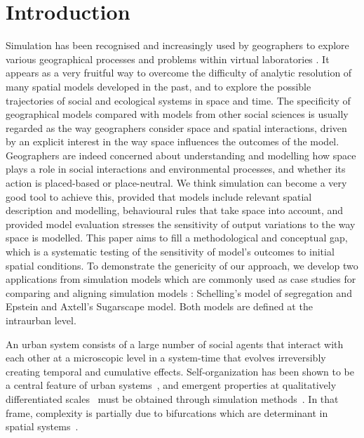 \documentclass[Afour,sageh,times]{sagej}
\begin{document}

\maketitle




\section{Introduction}

Simulation has been recognised and increasingly used by geographers to explore various geographical processes and problems within virtual laboratories \citep{Quesneletal2009} . It appears as a very fruitful way to overcome the difficulty of analytic resolution of many spatial models developed in the past, and to explore the possible trajectories of social and ecological systems in space and time. The specificity of geographical models compared with models from other social sciences is usually regarded as the way geographers consider space and spatial interactions, driven by an explicit interest in the way space influences the outcomes of the model. Geographers are indeed concerned about understanding and modelling how space plays a role in social interactions and environmental processes, and whether its action is placed-based or place-neutral. We think simulation can become a very good tool to achieve this, provided that models include relevant spatial description and modelling, behavioural rules that take space into account, and provided model evaluation stresses the sensitivity of output variations to the way space is modelled. This paper aims to fill a methodological and conceptual gap, which is a systematic testing of the sensitivity of model's outcomes to initial spatial conditions. To demonstrate the genericity of our approach, we develop two applications from simulation models which are commonly used as case studies for comparing and aligning simulation models \citep{Axtelletal1996}: Schelling's model of segregation and Epstein and Axtell's Sugarscape model. Both models are defined at the intraurban level.

An urban system consists of a large number of social agents that interact with each other at a microscopic level in a system-time that evolves irreversibly creating temporal and cumulative effects. Self-organization has been shown to be a central feature of urban systems~\citep{AllenSanglier1981,Portugali2000}, and emergent properties at qualitatively differentiated scales~\citep{AzizAlaouiBertelle2009} must be obtained through simulation methods~\citep{Wu2002,Batty2007}. In that frame, complexity is partially due to bifurcations \citep{Wilson1981} which are determinant in spatial systems~\citep{Wilson2002}. 
\end{document}
